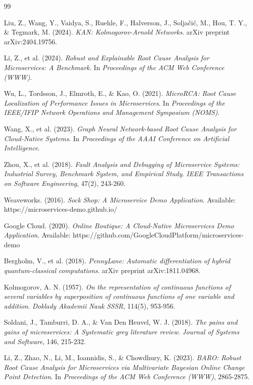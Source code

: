\documentclass[10pt,a4paper,twocolumn]{article}
\begin{document}
\begin{thebibliography}{99}
\small

Liu, Z., Wang, Y., Vaidya, S., Ruehle, F., Halverson, J., Soljačić, M., Hou, T. Y., \& Tegmark, M. (2024).
\textit{KAN: Kolmogorov-Arnold Networks}.
arXiv preprint arXiv:2404.19756.

Li, Z., et al. (2024).
\textit{Robust and Explainable Root Cause Analysis for Microservices: A Benchmark}.
In \textit{Proceedings of the ACM Web Conference (WWW)}.

Wu, L., Tordsson, J., Elmroth, E., \& Kao, O. (2021).
\textit{MicroRCA: Root Cause Localization of Performance Issues in Microservices}.
In \textit{Proceedings of the IEEE/IFIP Network Operations and Management Symposium (NOMS)}.

Wang, X., et al. (2023).
\textit{Graph Neural Network-based Root Cause Analysis for Cloud-Native Systems}.
In \textit{Proceedings of the AAAI Conference on Artificial Intelligence}.

Zhou, X., et al. (2018).
\textit{Fault Analysis and Debugging of Microservice Systems: Industrial Survey, Benchmark System, and Empirical Study}.
\textit{IEEE Transactions on Software Engineering}, 47(2), 243-260.

Weaveworks. (2016).
\textit{Sock Shop: A Microservice Demo Application}.
Available: https://microservices-demo.github.io/

Google Cloud. (2020).
\textit{Online Boutique: A Cloud-Native Microservices Demo Application}.
Available: https://github.com/GoogleCloudPlatform/microservices-demo

Bergholm, V., et al. (2018).
\textit{PennyLane: Automatic differentiation of hybrid quantum-classical computations}.
arXiv preprint arXiv:1811.04968.

Kolmogorov, A. N. (1957).
\textit{On the representation of continuous functions of several variables by superposition of continuous functions of one variable and addition}.
\textit{Doklady Akademii Nauk SSSR}, 114(5), 953-956.

Soldani, J., Tamburri, D. A., \& Van Den Heuvel, W. J. (2018).
\textit{The pains and gains of microservices: A Systematic grey literature review}.
\textit{Journal of Systems and Software}, 146, 215-232.

Li, Z., Zhao, N., Li, M., Ioannidis, S., \& Chowdhury, K. (2023).
\textit{BARO: Robust Root Cause Analysis for Microservices via Multivariate Bayesian Online Change Point Detection}.
In \textit{Proceedings of the ACM Web Conference (WWW)}, 2865-2875.


\end{thebibliography}
\end{document}
